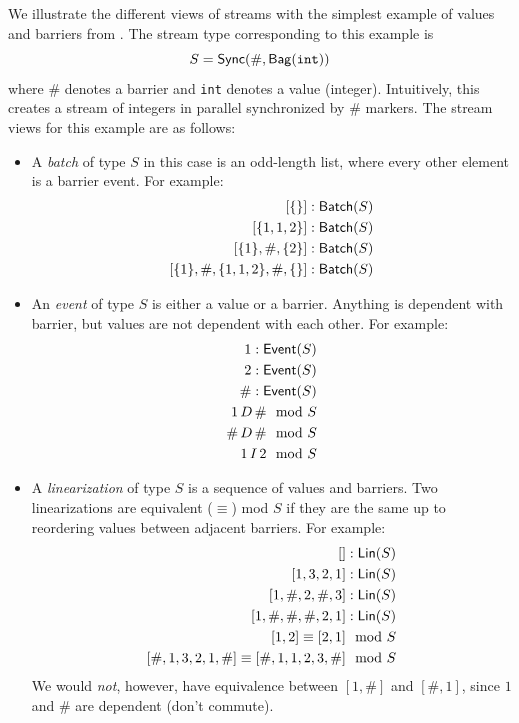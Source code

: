 We illustrate the different views of streams with the simplest example of values and barriers from . The stream type corresponding to this example is
\[
S = \mathsf{Sync}({\#}, \mathsf{Bag}({\texttt{int}}))
\]
where $\#$ denotes a barrier and \texttt{int} denotes a value (integer).
Intuitively, this creates a stream of integers in parallel synchronized by $\#$ markers.
The stream views for this example are as follows:
\begin{itemize}
\item A \emph{batch} of type $S$ in this case is an odd-length list, where every other element is a barrier event. For example:
\begin{align*}
  \batchtype{[\{\}]}{S}& \\
  \batchtype{[\{1, 1, 2\}]}{S}& \\
  \batchtype{[\{1\}, \#, \{2\}]}{S}& \\
  \batchtype{[\{1\}, \#, \{1, 1, 2\}, \#, \{\}]}{S}&
\end{align*}
\item An \emph{event} of type $S$ is either a value or a barrier. Anything is dependent with barrier, but values are not dependent with each other. For example:
\begin{align*}
  1: \mathsf{Event}({S})& \\
  2: \mathsf{Event}({S})& \\
  \#: \mathsf{Event}({S})& \\
  1 \,D\, \# \mod {S}& \\
  \# \,D\, \# \mod {S}& \\
  1 \,I\, 2 \mod {S}&
\end{align*}
\item A \emph{linearization} of type $S$ is a sequence of values and barriers. Two linearizations are equivalent ($\equiv$) mod $S$ if they are the same up to reordering values between adjacent barriers. For example:
\begin{align*}
  \lintype{[]}{S}& \\
  \lintype{[1, 3, 2, 1]}{S}& \\
  \lintype{[1, \#, 2, \#, 3]}{S}& \\
  \lintype{[1, \#, \#, \#, 2, 1]}{S}& \\
  \equivtype{[1, 2]}{[2, 1]}{S}& \\
  \equivtype{[\#, 1, 3, 2, 1, \#]}{[\#, 1, 1, 2, 3, \#]}{S}& \\
\end{align*}
We would \emph{not}, however, have equivalence between $[1, \#]$ and $[\#, 1]$, since $1$ and $\#$ are dependent (don't commute).

\end{itemize}
